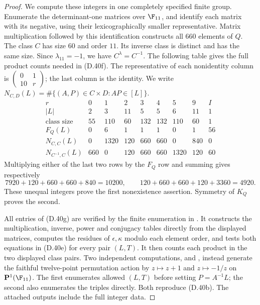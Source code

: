 \begin{proof}
We compute these integers in one completely specified
finite group. Enumerate the determinant-one matrices
over $\F_{11}$, and identify each matrix with its
negative, using their lexicographically smaller
representative. Matrix multiplication followed by this
identification constructs all $660$ elements of $Q$.
The class $C$ has size $60$ and order $11$.
Its inverse class is distinct and has the same size.
Since $\lambda_{11}=-1$, we have $C^\lambda=C^{-1}$.
The following table gives the full product counts needed
in (D.40f). The representative of each nonidentity
column is $\left(\begin{smallmatrix}0&1\\10&r\end{smallmatrix}\right)$;
the last column is the identity. We write
$N_{C,D}(L)=\#\{(A,P)\in C\times D:AP\in[L]\}$.
\[
\begin{array}{c|rrrrrrrr}
 r&0&1&2&3&4&5&9&I\\\hline
 |L|&2&3&11&5&5&6&11&1\\
 \text{class size}&55&110&60&132&132&110&60&1\\
 F_Q(L)&0&6&1&1&1&0&1&56\\
 N_{C,C}(L)
   &0&1320&120&660&660&0&840&0\\
 N_{C^{-1},C}(L)
   &660&0&120&660&660&1320&120&60
\end{array}                                               \tag{D.40g}
\]
Multiplying either of the last two rows by the
$F_Q$ row and summing gives respectively
\[
 7920+120+660+660+840=10200,
 \qquad 120+660+660+120+3360=4920.
\]
These unequal integers prove the first nonexistence
assertion. Symmetry of $K_Q$ proves the second.

All entries of (D.40g) are verified by the finite
enumeration in .
It constructs the multiplication, inverse, power and
conjugacy tables directly from the displayed matrices,
computes the residues of $\epsilon,\kappa$ modulo each
element order, and tests both equations in (D.40e) for
every pair $(L,T)$. It then counts each product in the
two displayed class pairs. Two independent computations,
 and
,
instead generate the faithful twelve-point permutation
action by $z\mapsto z+1$ and $z\mapsto-1/z$ on
$\mathbf P^1(\F_{11})$. The first enumerates allowed
$(L,T)$ before setting $P=A^{-1}L$; the second also
enumerates the triples directly. Both reproduce (D.40b).
The attached outputs include the full integer data.


\end{proof}
